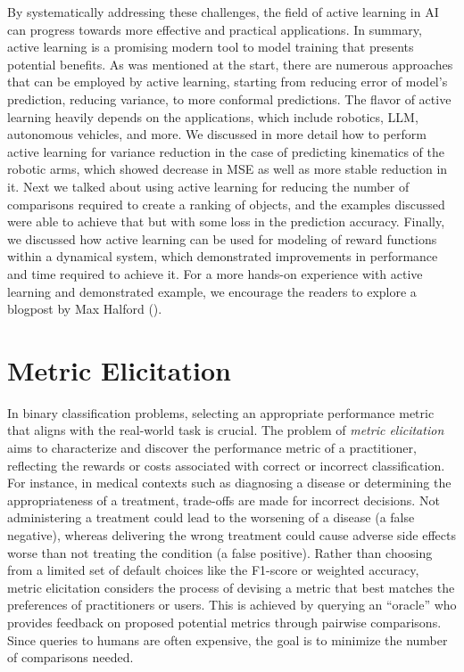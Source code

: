 \documentclass[
  letterpaper,
  numbers=noenddot,
  DIV=11]{scrreprt}
\theoremstyle{definition}
\theoremstyle{plain}
\theoremstyle{plain}
\theoremstyle{remark}
\begin{document}
By systematically addressing these challenges, the field of active
learning in AI can progress towards more effective and practical
applications. In summary, active learning is a promising modern tool to
model training that presents potential benefits. As was mentioned at the
start, there are numerous approaches that can be employed by active
learning, starting from reducing error of model's prediction, reducing
variance, to more conformal predictions. The flavor of active learning
heavily depends on the applications, which include robotics, LLM,
autonomous vehicles, and more. We discussed in more detail how to
perform active learning for variance reduction in the case of predicting
kinematics of the robotic arms, which showed decrease in MSE as well as
more stable reduction in it. Next we talked about using active learning
for reducing the number of comparisons required to create a ranking of
objects, and the examples discussed were able to achieve that but with
some loss in the prediction accuracy. Finally, we discussed how active
learning can be used for modeling of reward functions within a dynamical
system, which demonstrated improvements in performance and time required
to achieve it. For a more hands-on experience with active learning and
demonstrated example, we encourage the readers to explore a blogpost by
Max Halford ().

\section{Metric Elicitation}\label{sec-metric-elicitation}

In binary classification problems, selecting an appropriate performance
metric that aligns with the real-world task is crucial. The problem of
\emph{metric elicitation} aims to characterize and discover the
performance metric of a practitioner, reflecting the rewards or costs
associated with correct or incorrect classification. For instance, in
medical contexts such as diagnosing a disease or determining the
appropriateness of a treatment, trade-offs are made for incorrect
decisions. Not administering a treatment could lead to the worsening of
a disease (a false negative), whereas delivering the wrong treatment
could cause adverse side effects worse than not treating the condition
(a false positive). Rather than choosing from a limited set of default
choices like the F1-score or weighted accuracy, metric elicitation
considers the process of devising a metric that best matches the
preferences of practitioners or users. This is achieved by querying an
``oracle'' who provides feedback on proposed potential metrics through
pairwise comparisons. Since queries to humans are often expensive, the
goal is to minimize the number of comparisons needed.
\end{document}
